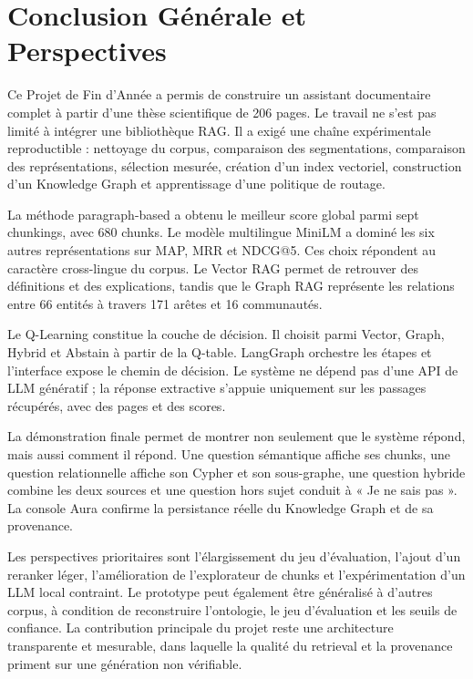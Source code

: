 \documentclass[12pt,a4paper,oneside]{report}
\begin{document}
\chapter*{Conclusion Générale et Perspectives}
Ce Projet de Fin d'Année a permis de construire un assistant documentaire complet à partir d'une thèse scientifique de 206 pages. Le travail ne s'est pas limité à intégrer une bibliothèque RAG. Il a exigé une chaîne expérimentale reproductible : nettoyage du corpus, comparaison des segmentations, comparaison des représentations, sélection mesurée, création d'un index vectoriel, construction d'un Knowledge Graph et apprentissage d'une politique de routage.

La méthode paragraph-based a obtenu le meilleur score global parmi sept chunkings, avec 680 chunks. Le modèle multilingue MiniLM a dominé les six autres représentations sur MAP, MRR et NDCG@5. Ces choix répondent au caractère cross-lingue du corpus. Le Vector RAG permet de retrouver des définitions et des explications, tandis que le Graph RAG représente les relations entre 66 entités à travers 171 arêtes et 16 communautés.

Le Q-Learning constitue la couche de décision. Il choisit parmi Vector, Graph, Hybrid et Abstain à partir de la Q-table. LangGraph orchestre les étapes et l'interface expose le chemin de décision. Le système ne dépend pas d'une API de LLM génératif ; la réponse extractive s'appuie uniquement sur les passages récupérés, avec des pages et des scores.

La démonstration finale permet de montrer non seulement que le système répond, mais aussi comment il répond. Une question sémantique affiche ses chunks, une question relationnelle affiche son Cypher et son sous-graphe, une question hybride combine les deux sources et une question hors sujet conduit à « Je ne sais pas ». La console Aura confirme la persistance réelle du Knowledge Graph et de sa provenance.

Les perspectives prioritaires sont l'élargissement du jeu d'évaluation, l'ajout d'un reranker léger, l'amélioration de l'explorateur de chunks et l'expérimentation d'un LLM local contraint. Le prototype peut également être généralisé à d'autres corpus, à condition de reconstruire l'ontologie, le jeu d'évaluation et les seuils de confiance. La contribution principale du projet reste une architecture transparente et mesurable, dans laquelle la qualité du retrieval et la provenance priment sur une génération non vérifiable.
\end{document}
